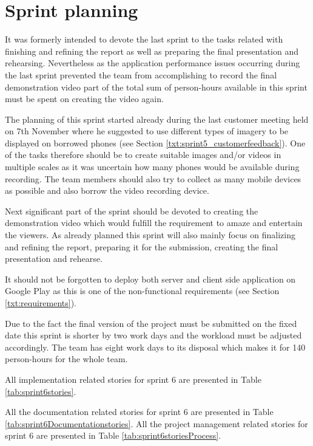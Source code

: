 \section{Sprint planning}
It was formerly intended to devote the last sprint to the tasks related with finishing and refining the report as well as preparing the final presentation and rehearsing. Nevertheless as the application performance issues occurring during the last sprint prevented the team from accomplishing to record the final demonstration video part of the total sum of person-hours available in this sprint must be spent on creating the video again.

The planning of this sprint started already during the last customer meeting held on 7th November where he suggested to use different types of imagery to be displayed on borrowed phones (see Section \ref{txt:sprint5_customerfeedback}). One of the tasks therefore should be to create suitable images and/or videos in multiple scales as it was uncertain how many phones would be available during recording. The team members should also try to collect as many mobile devices as possible and also borrow the video recording device.

Next significant part of the sprint should be devoted to creating the demonstration video which would fulfill the requirement to amaze and entertain the viewers. As already planned this sprint will also mainly focus on finalizing and refining the report, preparing it for the submission, creating the final presentation and rehearse.

It should not be forgotten to deploy both server and client side application on Google Play as this is one of the non-functional requirements (see Section \ref{txt:requirements}).

Due to the fact the final version of the project must be submitted on the fixed date this sprint is shorter by two work days and the workload must be adjusted accordingly. The team has eight work days to its disposal which makes it for 140 person-hours for the whole team.

All implementation related stories for sprint 6 are presented in Table \ref{tab:sprint6stories}.

All the documentation related stories for sprint 6 are presented in Table \ref{tab:sprint6Documentationstories}. 
 All the project management related stories for sprint 6 are presented in Table \ref{tab:sprint6storiesProcess}.



